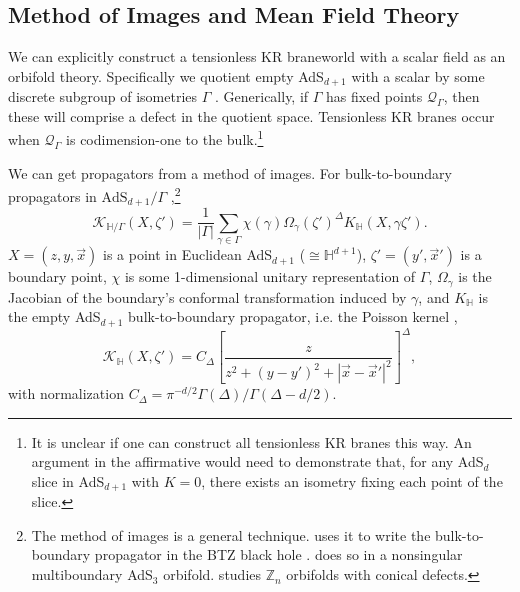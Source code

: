 \documentclass[reprint,amsmath,amssymb,aps,nofootinbib,twocolumn]{revtex4-2}
\begin{document}
\begin{appendix}
\section{Method of Images and Mean Field Theory}\label{app:images}

We can explicitly construct a tensionless KR braneworld with a scalar field as an orbifold theory. Specifically we quotient empty AdS$_{d+1}$ with a scalar by some discrete subgroup of isometries $\Gamma$ \cite{Horowitz:1998xk,Gao:1999er,Shashi:2020mkd}. Generically, if $\Gamma$ has fixed points $\mathcal{Q}_\Gamma$, then these will comprise a defect in the quotient space. Tensionless KR branes occur when $\mathcal{Q}_\Gamma$ is codimension-one to the bulk.\footnote{It is unclear if one can construct all tensionless KR branes this way. An argument in the affirmative would need to demonstrate that, for any AdS$_d$ slice in AdS$_{d+1}$ with $K = 0$, there exists an isometry fixing each point of the slice.}

We can get propagators from a method of images. For bulk-to-boundary propagators in $\text{AdS}_{d+1}/\Gamma$ \cite{Gao:1999er},\footnote{The method of images is a general technique. \cite{KeskiVakkuri:1998nw} uses it to write the bulk-to-boundary propagator in the BTZ black hole \cite{Banados:1992gq}. \cite{Balasubramanian:2003kq} does so in a nonsingular multiboundary AdS$_3$ orbifold. \cite{Arefeva:2015zra,Ageev:2015qbz,Ageev:2017yno,Arefeva:2016wek,Arefeva:2016nic} studies $\mathbb{Z}_n$ orbifolds with conical defects.}
\begin{equation}
\mathcal{K}_{\mathbb{H}/\Gamma}(X,\zeta') = \frac{1}{|\Gamma|} \sum_{\gamma \in \Gamma} \chi(\gamma)\Omega_\gamma(\zeta')^\Delta K_\mathbb{H}(X,\gamma \zeta').
\end{equation}
$X = (z,y,\vec{x})$ is a point in Euclidean AdS$_{d+1}$ ($\cong \mathbb{H}^{d+1}$), $\zeta' = (y',\vec{x}')$ is a boundary point, $\chi$ is some 1-dimensional unitary representation of $\Gamma$, $\Omega_\gamma$ is the Jacobian of the boundary's conformal transformation induced by $\gamma$, and $K_\mathbb{H}$ is the empty AdS$_{d+1}$ bulk-to-boundary propagator, i.e. the Poisson kernel \cite{Freedman:1998tz,DHoker:2002nbb},
\begin{equation}
\mathcal{K}_\mathbb{H}(X,\zeta') = C_\Delta \left[\frac{z}{z^2 + (y-y')^2 + |\vec{x}-\vec{x}'|^2}\right]^\Delta,
\end{equation}
with normalization $C_\Delta = \pi^{-d/2}\Gamma(\Delta)/\Gamma(\Delta - d/2)$.


\end{appendix}
\end{document}
